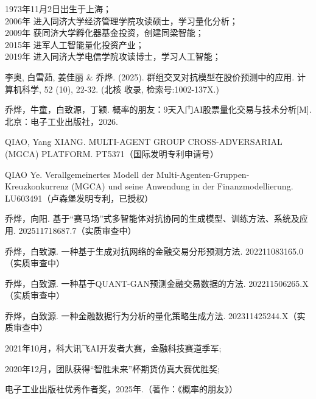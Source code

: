 \noindent 1973年11月2日出生于上海；\\
\noindent 2006年 进入同济大学经济管理学院攻读硕士，学习量化分析；\\
\noindent 2009年 获同济大学孵化器基金投资，创建同梁智能；\\
\noindent 2015年 进军人工智能量化投资产业；\\
\noindent 2019年 进入同济大学电信学院攻读博士，学习人工智能；\\


\begin{enumerate}[{[}1{]}]
\item 李奥, 白雪茹, 姜佳丽 \&  乔烨. (2025). 群组交叉对抗模型在股价预测中的应用. 计算机科学, 52 (10), 22-32. (北核 收录, 检索号:1002-137X.)
\end{enumerate}

\begin{enumerate}[{[}1{]}]
\item 乔烨，牛童，白致源，丁颖. 概率的朋友：9天入门AI股票量化交易与技术分析[M].\\北京：电子工业出版社，2026.
\end{enumerate}

\begin{enumerate}[{[}1{]}]
\item QIAO, Yang XIANG. MULTI-AGENT GROUP CROSS-ADVERSARIAL (MGCA) PLATFORM. PT5371（国际发明专利申请号）\\
\item QIAO Ye. Verallgemeinertes Modell der Multi-Agenten-Gruppen-Kreuzkonkurrenz (MGCA) und seine Anwendung in der Finanzmodellierung. LU603491（卢森堡发明专利，已授权）\\
\item 乔烨，向阳. 基于“赛马场”式多智能体对抗协同的生成模型、训练方法、系统及应用. 202511718687.7（实质审查中）\\
\item 乔烨，白致源. 一种基于生成对抗网络的金融交易分形预测方法. 202211083165.0（实质审查中）\\
\item 乔烨，白致源. 一种基于QUANT-GAN预测金融交易数据的方法. 202211506265.X（实质审查中）\\
\item 乔烨，白致源. 一种金融数据行为分析的量化策略生成方法. 202311425244.X（实质审查中）\\
\end{enumerate}

\begin{enumerate}[{[}1{]}]
\item 2021年10月，科大讯飞AI开发者大赛，金融科技赛道季军;
\item 2020年12月，团队获得“智胜未来”杯期货仿真大赛优胜奖;
\item 电子工业出版社优秀作者奖，2025年.（著作：《概率的朋友》）
\end{enumerate}
